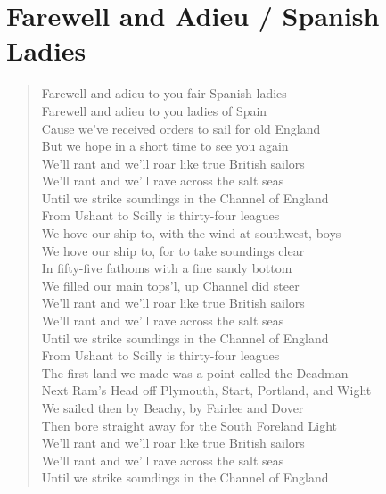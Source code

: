 \documentclass[11pt]{article}
\begin{document}
\section{Farewell and Adieu / Spanish Ladies}
\label{sec:orgac440f3}
\begin{verse}
Farewell and adieu to you fair Spanish ladies\\
Farewell and adieu to you ladies of Spain\\
Cause we’ve received orders to sail for old England\\
But we hope in a short time to see you again\\
\vspace*{1em}
We’ll rant and we’ll roar like true British sailors\\
We’ll rant and we’ll rave across the salt seas\\
Until we strike soundings in the Channel of England\\
From Ushant to Scilly is thirty-four leagues\\
\vspace*{1em}
We hove our ship to, with the wind at southwest, boys\\
We hove our ship to, for to take soundings clear\\
In fifty-five fathoms with a fine sandy bottom\\
We filled our main tops’l, up Channel did steer\\
We’ll rant and we’ll roar like true British sailors\\
We’ll rant and we’ll rave across the salt seas\\
Until we strike soundings in the Channel of England\\
From Ushant to Scilly is thirty-four leagues\\
\vspace*{1em}
The first land we made was a point called the Deadman\\
Next Ram's Head off Plymouth, Start, Portland, and Wight\\
We sailed then by Beachy, by Fairlee and Dover\\
Then bore straight away for the South Foreland Light\\
\vspace*{1em}
We’ll rant and we’ll roar like true British sailors\\
We’ll rant and we’ll rave across the salt seas\\
Until we strike soundings in the Channel of England\\

\end{verse}
\end{document}
